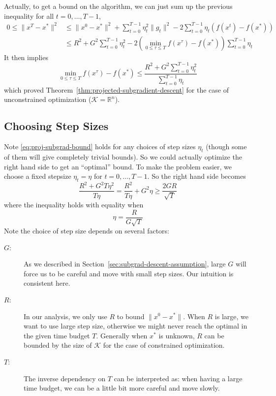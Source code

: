 \documentclass{scrartcl}
\newcommand{\RR}{\mathbb{R}}
\newcommand{\sK}{\mathcal{K}}
\begin{document}
Actually, to get a bound on the algorithm, we can just sum up the previous inequality for all
$t=0,\ldots,T-1$,
\[
  \begin{aligned}
    0\leq\|x^T-x^*\|^2
    &\leq \|x^0-x^*\|^2 + \sum_{t=0}^{T-1}\eta_t^2\|g_t\|^2 - 2\sum_{t=0}^{T-1}\eta_t \left(f(x^t)-f
    (x^*)\right) \\
    &\leq R^2 + G^2\sum_{t=0}^{T-1}\eta_t^2 -2\left(\min_{0\leq\tau\leq T}f(x^\tau) - f
    (x^*)\right)\sum_{t=0}^{T-1}\eta_t
  \end{aligned}
\]
It then implies
\begin{equation}
\min_{0\leq\tau\leq T}f(x^\tau) - f(x^*) \leq \frac{R^2 + G^2\sum_{t=0}^{T-1}\eta_t^2}{\sum_{t=0}^
{T-1}\eta_t}
\end{equation}
which proved Theorem~\ref{thm:projected-subgradient-descent} for the case of unconstrained
optimization ($\sK=\RR^n$).

\subsection{Choosing Step Sizes}

Note \eqref{eq:proj-subgrad-bound} holds for any choices of step sizes $\eta_t$ (though some of them
will give completely trivial bounds). So we could actually optimize the right hand side to get an
``optimal'' bound. To make the problem easier, we choose a fixed stepsize $\eta_t=\eta$ for
$t=0,\ldots,T-1$. So the right hand side becomes
\begin{equation}
  \frac{R^2+G^2T\eta^2}{T\eta} = \frac{R^2}{T\eta} + G^2\eta \geq \frac{2GR}{\sqrt{T}}
  \label{eq:subgrad-bound-fix-eta}
\end{equation}
where the inequality holds with equality when
\begin{equation}
  \eta = \frac{R}{G\sqrt{T}}
\end{equation}
Note the choice of step size depends on several factors:
\begin{description}
  \item[$G$:] As we described in Section~\ref{sec:subgrad-descent-assumption}, large $G$ will force
  us to be careful and move with small step sizes. Our intuition is consistent here.
  \item[$R$:] In our analysis, we only use $R$ to bound $\|x^0-x^*\|$. When $R$ is large, we want to
  use large step size, otherwise we might never reach the optimal in the given time budget $T$.
  Generally when $x^*$ is unknown, $R$ can be bounded by the size of $\sK$ for the case
  of constrained optimization.
  \item[$T$:] The inverse dependency on $T$ can be interpreted as: when having a large time budget,
  we can be a little bit more careful and move slowly.
\end{description}
\end{document}
